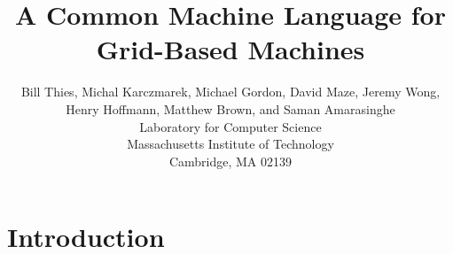 \documentclass{sig-alternate}
\begin{document}
\title{A Common Machine Language for Grid-Based Machines}


\author{
\alignauthor \vspace{-18pt}
Bill Thies, 
Michal Karczmarek, 
Michael Gordon, 
David Maze, 
Jeremy Wong,
Henry Hoffmann, 
Matthew Brown, 
and Saman Amarasinghe\\
	\vspace{6pt}
	Laboratory for Computer Science \\
	Massachusetts Institute of Technology \\
	Cambridge, MA  02139 \\
}

\newcommand{\ma}[2]{max_{#1 \rightarrow #2}}
\newcommand{\mi}[2]{\textsc{sdep}_{#2 \small{\rightarrow} #1}}
\newcommand{\floor}[2]{\left\lfloor\frac{#1}{#2}\right\rfloor}
\newcommand{\ceil}[2]{\left\lceil\frac{#1}{#2}\right\rceil}
\newcommand{\ra}[0]{\rightarrow}
\newcommand{\la}[0]{\lambda}

\def\fn#1{\mathop{\mbox{\it #1}}}
\def\fun#1#2{\ensuremath{\mathop{\mbox{\it #1}}(#2)}} %

\newtheorem{definition}{Definition}
\newtheorem{theorem}{Theorem}

\maketitle


\section{Introduction}
\end{document}
